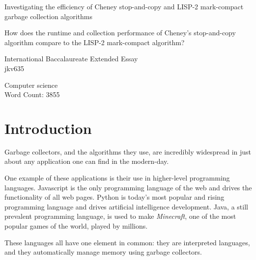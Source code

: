 \documentclass[index]{subfiles}
\begin{document}
\doublespacing{}
\begin{titlepage}
    \begin{center}
        \vspace*{1cm}

        {\huge{Investigating the efficiency of Cheney stop-and-copy and LISP-2 mark-compact garbage collection algorithms}}

        \vspace{1.5cm}

        How does the runtime and collection performance of Cheney's stop-and-copy algorithm compare to the LISP-2 mark-compact algorithm?

        \vspace{1.5cm}

        \vfill

        International Baccalaureate Extended Essay\\
        jkv635\\

        \vspace{0.8cm}

        Computer science\\
        \vspace{0.8cm}
        Word Count: 3855\\

    \end{center}
\end{titlepage}

\tableofcontents
\thispagestyle{empty}
\newpage
\setcounter{page}{1}

\section{Introduction}

Garbage collectors, and the algorithms they use, are incredibly widespread in just about any application one can find in the modern-day.

One example of these applications is their use in higher-level programming languages. Javascript is the only programming language of the web and drives the functionality of all web pages. Python is today's most popular and rising programming language and drives artificial intelligence development. Java, a still prevalent programming language, is used to make \textit{Minecraft}, one of the most popular games of the world, played by millions.

These languages all have one element in common: they are interpreted languages, and they automatically manage memory using garbage collectors.
\end{document}
